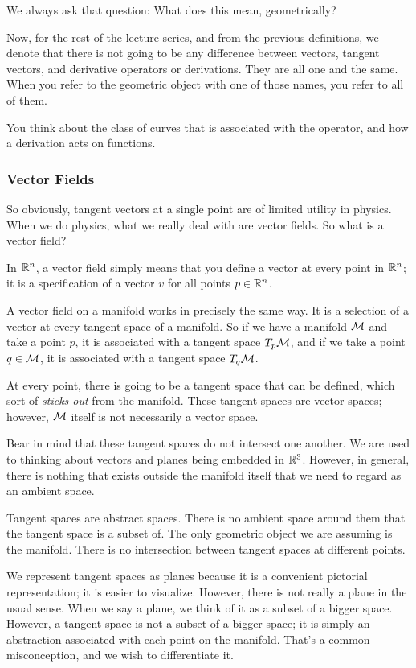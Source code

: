 		We always ask that question: What does this mean, geometrically?

		Now, for the rest of the lecture series, and from the previous definitions,
		we denote that there is not going to be any difference between vectors,
		tangent vectors, and derivative operators or derivations. They are all
		one and the same. When you refer to the geometric object with one of those
		names, you refer to all of them.

		You think about the class of curves that is associated with the operator,
		and how a derivation acts on functions.

	\subsubsection{Vector Fields}

		So obviously, tangent vectors at a single point are of limited utility
		in physics. When we do physics, what we really deal with are vector fields.
		So what is a vector field?

		In $\mathbb{R}^n$, a vector field simply means that you define a vector at every point
		in $\mathbb{R}^n$; it is a specification of a vector $v$ for all points $p\in\mathbb{R}^n$.

		A vector field on a manifold works in precisely the same way. It is a
		selection of a vector at every tangent space of a manifold. So if we have
		a manifold $\mathcal M$ and take a point $p$, it is associated with a tangent
		space $T_p\mathcal M$, and if we take a point $q\in\mathcal M$, it is associated
		with a tangent space $T_q\mathcal M$.

		At every point, there is going to be a tangent space that can be defined,
		which sort of \textit{sticks out} from the manifold.
		These tangent spaces are vector spaces; however, $\mathcal M$ itself is not
		necessarily a vector space.

		Bear in mind that these tangent spaces do not intersect one another.
		We are used to thinking about vectors and planes being embedded in $\mathbb{R}^3$.
		However, in general, there is nothing that exists outside the manifold itself
		that we need to regard as an ambient space.

		Tangent spaces are abstract spaces. There is no ambient space around them
		that the tangent space is a subset of. The only geometric object we are
		assuming is the manifold. There is no intersection between tangent spaces
		at different points.

		We represent tangent spaces as planes because it is a convenient pictorial
		representation; it is easier to visualize. However, there is not really a
		plane in the usual sense. When we say a plane, we think of it as a subset
		of a bigger space. However, a tangent space is not a subset of a bigger
		space; it is simply an abstraction associated with each point on the manifold.
		That's a common misconception, and we wish to differentiate it.

